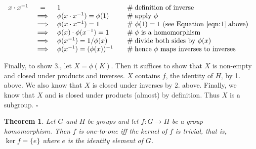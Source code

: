 \documentclass[11pt, oneside]{article}   	%
\newtheorem{thm}{Theorem}[section]
\theoremstyle{definition}
\begin{document}
\begin{equation}
\begin{array}{rcll}
 x \cdot x^{-1}
&=& 1                                                                              &\quad \mathrel{\#} \text{definition of inverse}   \\
&\implies& \phi(x \cdot x^{-1}) = \phi(1)                           &\quad \mathrel{\#} \text{apply $\phi$}          \\
&\implies& \phi(x \cdot x^{-1}) = 1                                   &\quad \mathrel{\#} \phi(1) =1 \text{ (see Equation \ref{eqn:1} above)}  \\
&\implies& \phi(x) \cdot \phi(x^{-1}) = 1                           &\quad \mathrel{\#} \phi \text{ is a homomorphism}    \\
&\implies&  \phi(x^{-1}) = 1/\phi(x)                                   &\quad \mathrel{\#}  \text{divide both sides by } \phi(x) \\
&\implies&  \phi(x^{-1}) = (\phi(x))^{-1}                             &\quad \mathrel{\#} \text{hence $\phi$ maps inverses to inverses}
\end{array}
\label{eqn:inverse}
\end{equation}

\bigskip
\noindent
Finally, to show 3., let $X = \phi(K)$. Then it suffices to show that $X$ is non-empty and closed under products and inverses. $X$ contains $f$, the identity of $H$, by 1.
above. We also know that  $X$ is closed under inverses by 2. above. Finally, we know that $X$  and is closed under products (almost) by definition. Thus $X$ is a subgroup. 
$\square$

\begin{thm}
Let $G$ and $H$ be groups and let $f: G \rightarrow H$ be a group homomorphism. Then $f$ is one-to-one iff the kernel of $f$
is trivial, that is, $\ker f = \{e\}$ where $e$ is the identity element of $G$.
\end{thm}
\end{document}
